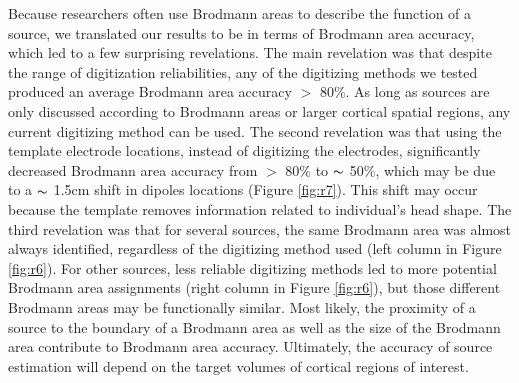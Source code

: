 \documentclass[../thesis_seyed.tex]{subfiles}
\begin{document}
Because researchers often use Brodmann areas to describe the function of a source, we translated our results to be in terms of Brodmann area accuracy, which led to a few surprising revelations. The main revelation was that despite the range of digitization reliabilities, any of the digitizing methods we tested produced an average Brodmann area accuracy $>$ 80\%. As long as sources are only discussed according to Brodmann areas or larger cortical spatial regions, any current digitizing method can be used. The second revelation was that using the template electrode locations, instead of digitizing the electrodes, significantly decreased Brodmann area accuracy from $>$ 80\% to $\thicksim$ 50\%, which may be due to a $\thicksim$ 1.5cm shift in dipoles locations (Figure \ref{fig:r7}). This shift may occur because the template removes information related to individual's head shape. The third revelation was that for several sources, the same Brodmann area was almost always identified, regardless of the digitizing method used (left column in Figure \ref{fig:r6}). For other sources, less reliable digitizing methods led to more potential Brodmann area assignments (right column in Figure \ref{fig:r6}), but those different Brodmann areas may be functionally similar. Most likely, the proximity of a source to the boundary of a Brodmann area as well as the size of the Brodmann area contribute to Brodmann area accuracy. Ultimately, the accuracy of source estimation will depend on the target volumes of cortical regions of interest.
\end{document}

